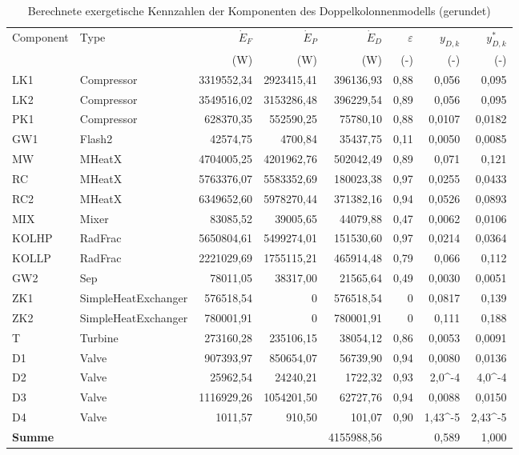 \begin{longtable}{llrrrrrr}
\caption{Berechnete exergetische Kennzahlen der Komponenten des Doppelkolonnenmodells (gerundet)} \\
\hline
Component & Type & $\dot{E}_F$ & $\dot{E}_P$ & $\dot{E}_D$ & $\varepsilon$ & $y_{D,k}$ & $y^*_{D,k}$ \\
 &  & (W) & (W) & (W) & (-) & (-) & (-) \\
\hline
LK1 & Compressor & 3319552,34 & 2923415,41 & 396136,93 & 0,88 & 0,056 & 0,095 \\
LK2 & Compressor & 3549516,02 & 3153286,48 & 396229,54 & 0,89 & 0,056 & 0,095 \\
PK1 & Compressor & 628370,35 & 552590,25 & 75780,10 & 0,88 & 0,0107 & 0,0182 \\
GW1 & Flash2 & 42574,75 & 4700,84 & 35437,75 & 0,11 & 0,0050 & 0,0085 \\
MW & MHeatX & 4704005,25 & 4201962,76 & 502042,49 & 0,89 & 0,071 & 0,121 \\
RC & MHeatX & 5763376,07 & 5583352,69 & 180023,38 & 0,97 & 0,0255 & 0,0433 \\
RC2 & MHeatX & 6349652,60 & 5978270,44 & 371382,16 & 0,94 & 0,0526 & 0,0893 \\
MIX & Mixer & 83085,52 & 39005,65 & 44079,88 & 0,47 & 0,0062 & 0,0106 \\
KOLHP & RadFrac & 5650804,61 & 5499274,01 & 151530,60 & 0,97 & 0,0214 & 0,0364 \\
KOLLP & RadFrac & 2221029,69 & 1755115,21 & 465914,48 & 0,79 & 0,066 & 0,112 \\
GW2 & Sep & 78011,05 & 38317,00 & 21565,64 & 0,49 & 0,0030 & 0,0051 \\
ZK1 & SimpleHeatExchanger & 576518,54 & 0 & 576518,54 & 0 & 0,0817 & 0,139 \\
ZK2 & SimpleHeatExchanger & 780001,91 & 0 & 780001,91 & 0 & 0,111 & 0,188 \\
T & Turbine & 273160,28 & 235106,15 & 38054,12 & 0,86 & 0,0053 & 0,0091 \\
D1 & Valve & 907393,97 & 850654,07 & 56739,90 & 0,94 & 0,0080 & 0,0136 \\
D2 & Valve & 25962,54 & 24240,21 & 1722,32 & 0,93 & 2,0\cdot10^{-4} & 4,0\cdot10^{-4} \\
D3 & Valve & 1116929,26 & 1054201,50 & 62727,76 & 0,94 & 0,0088 & 0,0150 \\
D4 & Valve & 1011,57 & 910,50 & 101,07 & 0,90 & 1,43\cdot10^{-5} & 2,43\cdot10^{-5} \\
\hline
\textbf{Summe} &  &  &  & 4155988,56 &  & 0,589 & 1,000 \\
\hline
\end{longtable}
